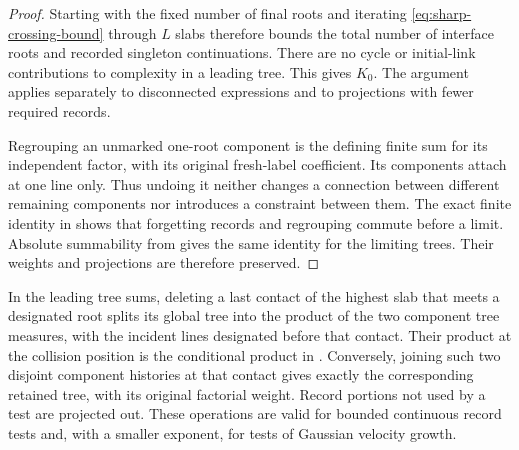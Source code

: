 \begin{proof}
Starting with the fixed number of final roots and iterating
\eqref{eq:sharp-crossing-bound} through \(L\) slabs therefore
bounds the total number of interface roots and recorded
singleton continuations.  There are no cycle or initial-link
contributions to complexity in a leading tree.  This gives
\(K_0\).  The argument applies separately to disconnected
expressions and to projections with fewer required records.

Regrouping an unmarked one-root component is the defining
finite sum for its independent factor, with its original
fresh-label coefficient.  Its components attach at one line
only.  Thus undoing it neither changes a connection between
different remaining components nor introduces a constraint
between them.  The exact finite identity in
 shows that forgetting records and
regrouping commute before a limit.  Absolute summability from
 gives the same identity for the
limiting trees.  Their weights and projections are therefore
preserved.
\end{proof}

\begin{lemma}\label{lem:sharp-tree-splitting}
In the leading tree sums, deleting a last contact of the highest
slab that meets a designated root splits its global tree into
the product of the two component tree measures, with the
incident lines designated before that contact.  Their product
at the collision position is the conditional product in
.  Conversely, joining such two
disjoint component histories at that contact gives exactly
the corresponding retained tree, with its original factorial
weight.  Record portions not used by a test are projected out.
These operations are valid for bounded continuous record tests
and, with a smaller exponent, for tests of Gaussian velocity
growth.
\end{lemma}

